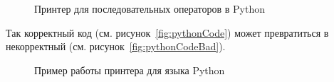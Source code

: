 \begin{figure}[h!]
	
	\caption{Принтер для последовательных операторов в Python}
	\label{fig:pythonPrinter}
\end{figure}

Так корректный код (см. рисунок~\ref{fig:pythonCode}) может превратиться в некорректный (см. рисунок~\ref{fig:pythonCodeBad}).
\begin{figure}[h!]
	\centering
	\null\hfill
	\subfloat[]{
		\centering
		
		\label{fig:pythonCode}	
	}
	\null\hfill
	\subfloat[]{
		\centering
		
		\label{fig:pythonCodeBad}
	}
	\hfill
	\null
	\caption{Пример работы принтера для языка Python}
\end{figure}